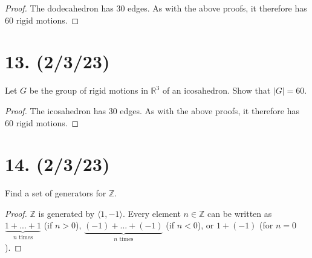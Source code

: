 \documentclass{article}
\begin{document}
\begin{proof}
    The dodecahedron has 30 edges. As with the above proofs, it therefore has 60 rigid motions.
\end{proof}

\section*{13. (2/3/23)}

Let $G$ be the group of rigid motions in $\mathbb{R}^3$ of an icosahedron. Show that $|G| = 60$.

\begin{proof}
    The icosahedron has 30 edges. As with the above proofs, it therefore has 60 rigid motions.
\end{proof}

\section*{14. (2/3/23)}

Find a set of generators for $\mathbb{Z}$.

\begin{proof}
    $\mathbb{Z}$ is generated by $\langle 1, -1 \rangle$. Every element $n \in \mathbb{Z}$ can be written as $\underbrace{1 + ... + 1}_{\text{$n$ times}}$ (if $n > 0$), $\underbrace{(-1) + ... + (-1)}_{\text{$n$ times}}$ (if $n < 0$), or $1 + (-1)$ (for $n = 0$).
\end{proof}
\end{document}
